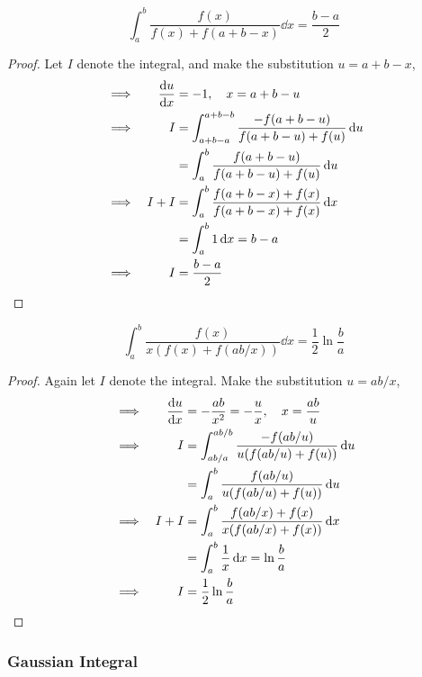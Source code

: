 \begin{theorem}
\begin{equation*}
\int_a^b \frac{f(x)}{f(x) + f(a + b - x)} \dd{x} = \frac{b - a} 2
\end{equation*}
\end{theorem}
\begin{proof}
Let \(I\) denote the integral, and make the substitution \(u = a + b - x\),
\begin{alignat*}{2}
&\implies& \dv{u}{x} &= -1, \quad x = a + b - u \\
&\implies& I &= \int_{a + b - a}^{a + b - b}
                    \frac{-f(a + b - u)}{f(a + b - u) + f(u)} \dd{u} \\
&&  &= \int_a^b \frac{f(a + b - u)}{f(a + b - u) + f(u)} \dd{u} \\
&\implies& I + I &= \int_a^b
                    \frac{f(a + b - x) + f(x)}
                         {f(a + b - x) + f(x)} \dd{x} \\
&&  &= \int_a^b 1 \dd{x} = b - a \\
&\implies& I &= \frac{b - a} 2 \qedhere
\end{alignat*}
\end{proof}
\begin{theorem}
\begin{equation*}
\int_a^b \frac{f(x)}{x(f(x) + f(ab / x))} \dd{x} = \frac 12 \ln \frac ba
\end{equation*}
\end{theorem}
\begin{proof}
Again let \(I\) denote the integral. Make the substitution \(u = ab / x\),
\begin{alignat*}{2}
&\implies& \dv{u}{x} &= -\frac{ab}{x^2} = -\frac ux, \quad x = \frac{ab}u \\
&\implies& I &= \int_{ab/a}^{ab/b} \frac{-f(ab / u)}{u(f(ab / u) + f(u))}
    \dd{u} \\
&& &= \int_a^b \frac{f(ab / u)}{u(f(ab / u) + f(u))} \dd{u} \\
&\implies& I + I &= \int_a^b \frac{f(ab / x) + f(x)}
                                  {x(f(ab / x) + f(x))} \dd{x} \\
&& &= \int_a^b \frac 1x \dd{x} = \ln \frac ba \\
&\implies& I &= \frac 12 \ln \frac ba \qedhere
\end{alignat*}
\end{proof}

\subsubsection{Gaussian Integral}

